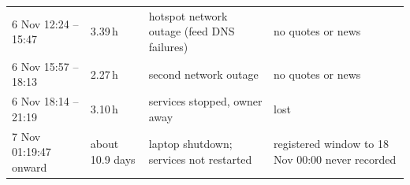 \documentclass[conference]{IEEEtran}
\begin{document}
\begin{table}[t]
\begin{tabular}{@{}p{}p{}p{}p{}@{}}
6 Nov 12:24 -- 15:47 & 3.39\,h & hotspot network outage (feed DNS failures) & no quotes or news\\
6 Nov 15:57 -- 18:13 & 2.27\,h & second network outage & no quotes or news\\
6 Nov 18:14 -- 21:19 & 3.10\,h & services stopped, owner away & lost\\
7 Nov 01:19:47 onward & about 10.9 days & laptop shutdown; services not restarted & registered window to 18 Nov 00:00 never recorded\\
\bottomrule
\end{tabular}
\end{table}



\end{document}
